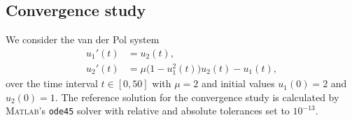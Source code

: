 \documentclass[final]{siamltex}  %
\begin{document}
\subsection{Convergence study}\label{subsec:convergence}
We consider the van der Pol system \cite{Hairer1987_book}
\begin{equation}\label{eq:conv_eq}
	\begin{split}
    		u_1'(t) &= u_2(t), \\
                u_2'(t) &= \mu \bigl(1 - u_1^2(t)\bigr)u_2(t) - u_1(t),
    \end{split}
\end{equation}
over the time interval $t \in [0, 50]$ with $\mu = 2$ and initial
values $u_1(0) = 2$ and $u_2(0) = 1$.
The reference solution for the convergence study is calculated by \textsc{Matlab}'s 
\texttt{ode45} solver with relative and absolute tolerances set to $10^{-13}$.
\end{document}
